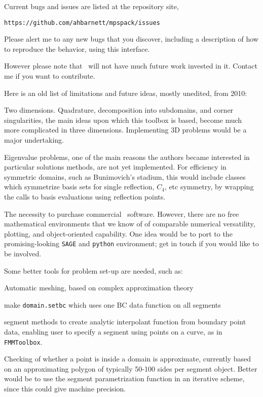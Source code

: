 \documentclass[12pt]{article}
\begin{document}
Current bugs and issues are listed at the repository site,

{\tt https://github.com/ahbarnett/mpspack/issues}

Please alert me to any new
bugs that you discover, including a description
of how to reproduce the behavior, using this interface.

However please note that \mpspack\ will not have much future
work invested in it. Contact me if you want to contribute.

Here is an old list of limitations and future ideas, mostly unedited,
from 2010:

\bi
\item Two dimensions. Quadrature, decomposition into subdomains, and
corner singularities, the
main ideas upon which this toolbox is based, become much more complicated
in three dimensions. 
Implementing 3D problems would be a major undertaking.

\item Eigenvalue problems, one of the main reasons the authors became
interested in particular solutions methods, are not yet implemented.
For efficiency in symmetric domains, such as Bunimovich's stadium,
this would include
classes which symmetrize basis sets for single reflection, $C_4$, etc
symmetry, by wrapping the calls to basis evaluations using reflection
points.

\item The necessity to purchase commercial \matlab\ software.
However, there are no free mathematical environments that we know of
of comparable numerical versatility, plotting, and object-oriented capability.
One idea would be to port to the promising-looking {\tt SAGE} and {\tt python}
environment; get in touch if you would like to be involved.

\item Some better tools for problem set-up are needed, such as:
\bi
  \item Automatic meshing, based on complex approximation theory
  \item make {\tt domain.setbc} which uses one BC data function on all segments
  \item segment methods to create analytic interpolant function from boundary
point data, enabling user to specify a segment using points on a curve,
as in {\tt FMMToolbox}.
\ei

\item Checking of whether a point is inside a domain is approximate,
currently based on an approximating polygon of typically 50-100 sides
per segment object.
Better would be to use the segment parametrization function in
an iterative scheme, since this could give machine precision.
\end{document}
